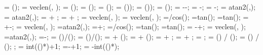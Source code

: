 {{\loaddya = \loaddyf*(\arrforceratio); %
\lena = veclen(\loaddxa, \loaddya);
\loaddxaleft = \loaddxf*(\midratioleft); %
\loaddyaleft = \loaddyf*(\midratioleft); %
\lenaleft = \lenf*(\midratioleft);
\loaddxaright = \loaddxf*(\midratioright)); %
\loaddyaright = \loaddyf*(\midratioright)); %
\lenaright = \lenf*(\midratioright);
\lenamid = \lena-\lenaleft-\lenaright;
\dahleft = \loadarrowheightmid-\loadarrowheightleft;
\dahright = \loadarrowheightmid-\loadarrowheightright;
\ldangleleft = atan2(\dahleft,\lenaleft);
\ldangleright = atan2(\dahright,\lenaright);
\totalangleleft = \loadangle + \ldangleleft;
\totalangleright = \loadangle + \ldangleright;
\totallengthleft = veclen(\lenaleft, \dahleft); %
\totallengthright = veclen(\lenaright, \dahright); %
\loadarrowlenleftnew=\loadarrowheightleft/cos(\extraangle);
\loadarrowleftshifta=\loadarrowheightleft*tan(\extraangle);
\loadarrowleftshiftb=\loadarrowheightmid*tan(\extraangle);
\lenaleftshift= \lenaleft+\loadarrowleftshiftb-\loadarrowleftshifta;
\totallengthleftnew = veclen(\lenaleftshift, \dahleft);
\newangleleft=atan2(\dahleft,\lenaleftshift);
\totalangleleftnew=\loadangle+\newangleleft;
%
\loadarrowlenrightnew=\loadarrowheightright/cos(\extraangle);
\loadarrowrightshifta=\loadarrowheightright*tan(\extraangle);
\loadarrowrightshiftb=\loadarrowheightmid*tan(\extraangle);
\lenarightshift= \lenaright-\loadarrowrightshiftb+\loadarrowrightshifta;
\totallengthrightnew = veclen(\lenarightshift, \dahright);
\newangleright=atan2(\dahright,\lenarightshift);
\totalanglerightnew=\loadangle-\newangleright;
\loadwxvalue = (\loaddxa)/(); %
\loadwyvalue = (\loaddya)/(); %
 = \loadstartcoordx + \loaddxf*(\loadstartratio);
 = \loadstartcoordy + \loaddyf*(\loadstartratio);
\loadxvalue{\loadarrownumber} =  + \loaddxa;
\loadyvalue{\loadarrownumber} =  + \loaddya;
\loadarrownumbermo = ;
\arrlenratioleft = (\midratioleft) / (\arrforceratio);
\arrlenratioright = (\midratioright) / (\arrforceratio);
;
\leftendarrno = int(()*\arrlenratioleft)+1;
\nleftarrows=\leftendarrno-\leftstartarrno+1;
\rightstartarrno = \loadarrownumber-int(()*\arrlenratioright);
}}

